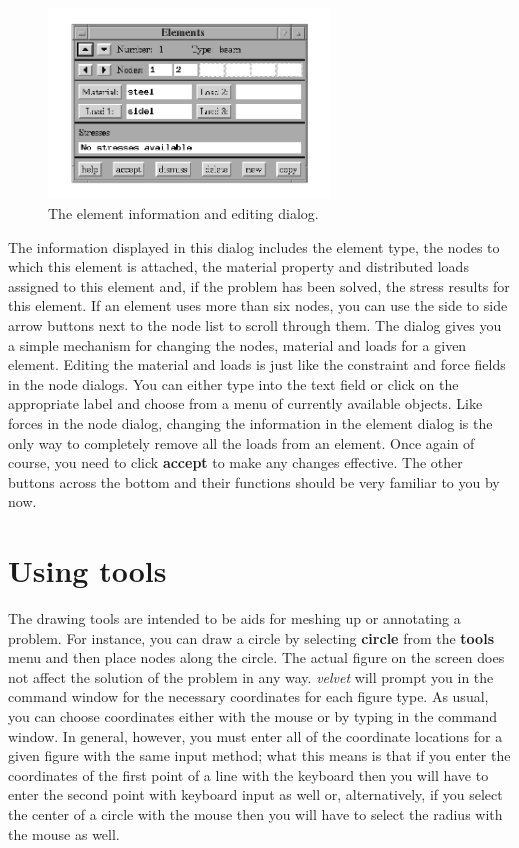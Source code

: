 \begin{figure}
\begin{center}
 \includegraphics[width=2.95in]{figures/velvet_element}
\end{center}
\caption{The element information and editing dialog.}
\label{velvet.element}
\end{figure}

The information displayed in this dialog includes
the element type, the nodes to which this element is attached, the
material property and distributed loads assigned to this element and,
if the problem has been solved, the stress results for this element.
If an element uses more than
six nodes, you can use the side to side arrow buttons next to the node list
to scroll through them.  
The dialog gives you a simple mechanism for changing the nodes,
material and loads for a given element.  Editing the material and
loads is just like the constraint and force fields in the node dialogs.  You
can either type into the text field or click on the appropriate label
and choose from a menu of currently available objects.  Like forces 
in the node dialog,
changing the information in the element dialog is the only way to 
completely remove all the loads from an element.  Once again of course, you
need to click {\bf accept} to make any changes effective.  The other
buttons across the bottom and their functions 
should be very familiar to you by now.

\section{Using tools}
\label{velvet.tools}

The drawing tools are intended to be aids for meshing up or annotating
a problem.  For instance, you can draw a circle by selecting {\bf circle} from 
the {\bf tools} menu and then place nodes 
along the circle.  The actual figure on the screen does not affect the 
solution of the problem in any way.  {\em velvet} will prompt you in the
command window for the necessary coordinates for each figure type.  As usual,
you can choose coordinates either with the mouse or by typing in the command
window.  In general, however, you must enter all of the coordinate locations
for a given figure with the same input method; what this means is that if
you enter the coordinates of the first point of a line with the keyboard
then you will have to enter the second point with keyboard input as well
or, alternatively, if you select the center of a circle with the mouse then
you will have to select the radius with the mouse as well.

